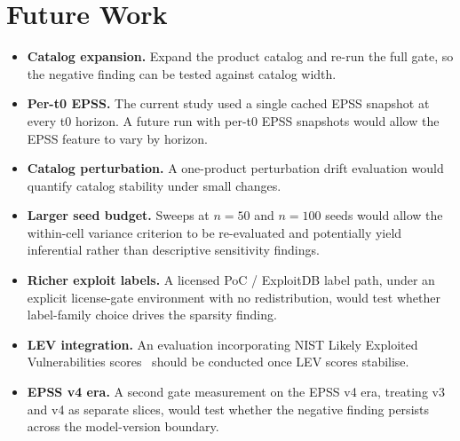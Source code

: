 \section{Future Work}
\begin{itemize}
 \item \textbf{Catalog expansion.} Expand the product catalog and re-run the full gate, so the negative finding can be tested against catalog width.
 \item \textbf{Per-t0 EPSS.} The current study used a single cached EPSS snapshot at every t0 horizon. A future run with per-t0 EPSS snapshots would allow the EPSS feature to vary by horizon.
 \item \textbf{Catalog perturbation.} A one-product perturbation drift evaluation would quantify catalog stability under small changes.
 \item \textbf{Larger seed budget.} Sweeps at $n = 50$ and $n = 100$ seeds would allow the within-cell variance criterion to be re-evaluated and potentially yield inferential rather than descriptive sensitivity findings.
 \item \textbf{Richer exploit labels.} A licensed PoC / ExploitDB label path, under an explicit license-gate environment with no redistribution, would test whether label-family choice drives the sparsity finding.
 \item \textbf{LEV integration.} An evaluation incorporating NIST Likely Exploited Vulnerabilities scores~\cite{MellSpring2025NISTLEV} should be conducted once LEV scores stabilise.
 \item \textbf{EPSS v4 era.} A second gate measurement on the EPSS v4 era, treating v3 and v4 as separate slices, would test whether the negative finding persists across the model-version boundary.
\end{itemize}
